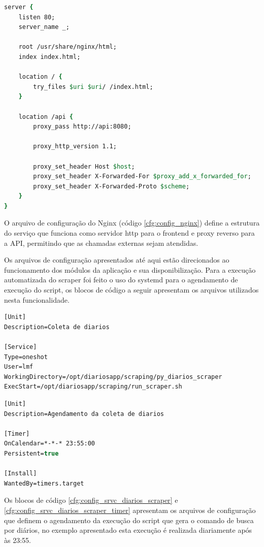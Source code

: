 \begin{lstlisting}[caption={nginx.conf}, label={cfg:config_nginx}, language=csh]
server {
    listen 80;
    server_name _;

    root /usr/share/nginx/html;
    index index.html;

    location / {
        try_files $uri $uri/ /index.html;
    }

    location /api {
        proxy_pass http://api:8080;

        proxy_http_version 1.1;

        proxy_set_header Host $host;
        proxy_set_header X-Forwarded-For $proxy_add_x_forwarded_for;
        proxy_set_header X-Forwarded-Proto $scheme;
    }
}
\end{lstlisting}

O arquivo de configuração do Nginx (código \ref{cfg:config_nginx}) define a estrutura do serviço que funciona como servidor http para o frontend e proxy reverso para a API, permitindo que as chamadas externas sejam atendidas.

Os arquivos de configuração apresentados até aqui estão direcionados ao funcionamento dos módulos da aplicação e sua disponibilização. Para a execução automatizada do scraper foi feito o uso do systemd para o agendamento de execução do script, os blocos de código a seguir apresentam os arquivos utilizados nesta funcionalidade.

\begin{lstlisting}[caption={diarios-scraper.service}, label={cfg:config_srvc_diarios_scraper}, language=csh]
[Unit]
Description=Coleta de diarios

[Service]
Type=oneshot
User=lmf
WorkingDirectory=/opt/diariosapp/scraping/py_diarios_scraper
ExecStart=/opt/diariosapp/scraping/run_scraper.sh
\end{lstlisting}

\begin{lstlisting}[caption={diarios-scraper.timer}, label={cfg:config_srvc_diarios_scraper_timer}, language=csh]
[Unit]
Description=Agendamento da coleta de diarios

[Timer]
OnCalendar=*-*-* 23:55:00
Persistent=true

[Install]
WantedBy=timers.target
\end{lstlisting}

Os blocos de código \ref{cfg:config_srvc_diarios_scraper} e \ref{cfg:config_srvc_diarios_scraper_timer} apresentam os arquivos de configuração que definem o agendamento da execução do script que gera o comando de busca por diários, no exemplo apresentado esta execução é realizada diariamente após às 23:55.

